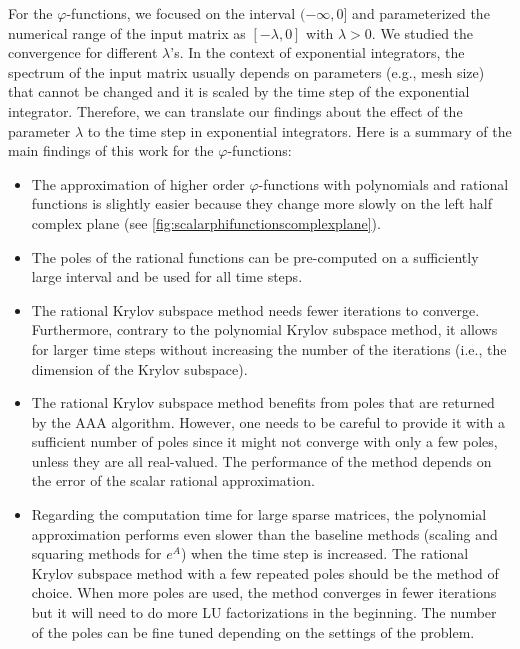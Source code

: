 For the $\varphi$-functions, we focused on the interval $(-\infty, 0]$ and parameterized
the numerical range of the input matrix as $[-\lambda, 0]$ with $\lambda > 0$. We studied the
convergence for different $\lambda$'s.
In the context of exponential integrators, the spectrum of the input matrix usually
depends on parameters (e.g., mesh size) that cannot be changed and it is scaled by the
time step of the exponential integrator.
Therefore, we can translate our findings about the effect of the parameter $\lambda$ to
the time step in exponential integrators.
Here is a summary of the main findings of this work for the $\varphi$-functions:
\begin{itemize}
    \item The approximation of higher order $\varphi$-functions with polynomials
        and rational functions is slightly easier because they change more slowly
        on the left half complex plane (see \autoref{fig:scalarphifunctionscomplexplane}).
    \item The poles of the rational functions can be pre-computed on a sufficiently
        large interval and be used for all time steps.
    \item The rational Krylov subspace method needs fewer iterations to converge.
        Furthermore, contrary to the polynomial Krylov subspace method, it allows for
        larger time steps without increasing the number of the iterations
        (i.e., the dimension of the Krylov subspace).
    \item The rational Krylov subspace method benefits from poles that are returned by
        the AAA algorithm.
        However, one needs to be careful to provide it with a sufficient number of poles
        since it might not converge with only a few poles, unless they are all real-valued.
        The performance of the method depends on the error of the scalar rational
        approximation.
    \item Regarding the computation time for large sparse matrices, the polynomial
        approximation performs even slower than the baseline methods
        (scaling and squaring methods for $e^A$) when the time step is increased.
        The rational Krylov subspace method with a few repeated poles should
        be the method of choice.
        When more poles are used, the method converges in fewer iterations but it will
        need to do more LU factorizations in the beginning. The number of the poles can be
        fine tuned depending on the settings of the problem.
\end{itemize}

